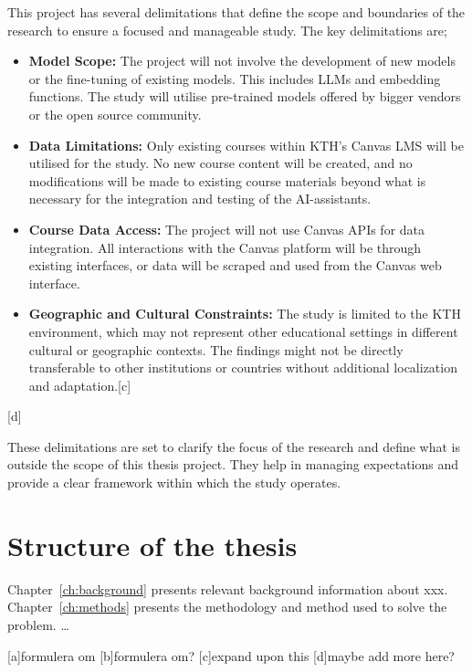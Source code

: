 This project has several delimitations that define the scope and boundaries of the research to ensure a focused and manageable study. The key delimitations are;


\begin{itemize}
        \item \textbf{Model Scope:} The project will not involve the development of new models or the fine-tuning of existing models. This includes LLMs and embedding functions. The study will utilise pre-trained models offered by bigger vendors or the open source community.
        \item \textbf{Data Limitations:} Only existing courses within KTH’s Canvas LMS will be utilised for the study. No new course content will be created, and no modifications will be made to existing course materials beyond what is necessary for the integration and testing of the AI-assistants.
        \item \textbf{Course Data Access:} The project will not use Canvas APIs for data integration. All interactions with the Canvas platform will be through existing interfaces, or data will be scraped and used from the Canvas web interface.
        \item \textbf{Geographic and Cultural Constraints:} The study is limited to the KTH environment, which may not represent other educational settings in different cultural or geographic contexts. The findings might not be directly transferable to other institutions or countries without additional localization and adaptation.[c]
\end{itemize}[d]


These delimitations are set to clarify the focus of the research and define what is outside the scope of this thesis project. They help in managing expectations and provide a clear framework within which the study operates.






\section{Structure of the thesis}




Chapter~\ref{ch:background} presents relevant background information about xxx.  Chapter~\ref{ch:methods} presents the methodology and method used to solve the problem. …


\cleardoublepage




[a]formulera om
[b]formulera om?
[c]expand upon this
[d]maybe add more here?